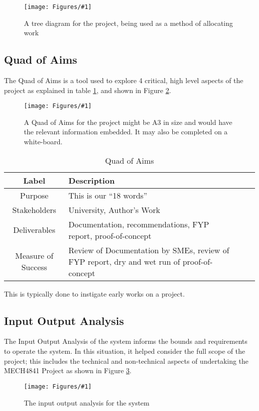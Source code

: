 \documentclass{UoNMCHA}
\newcommand{\fref}[1] {Figure \ref{#1}}
\newcommand{\fFigure}[3]{
	\begin{figure}[h]
        \begin{center}  
            \texttt{[image: Figures/\#1]}  
            \caption{#2}
            \label{#1}
        \end{center}
	\end{figure}
}
\numberwithin{equation}{section}
\begin{document}
 \fFigure{treeDiagram.png}{A tree diagram for the project, being used as a method of allocating work}{0.7}


\subsection{Quad of Aims}
The Quad of Aims is a tool used to explore 4 critical, high level aspects of the project as explained in table \ref{tab:QuadOfAims}, and shown in \fref{QuadOfAims2.png}.

\fFigure{QuadOfAims2.png}{A Quad of Aims for the project might be A3 in size and would have the relevant information embedded. It may also be completed on a white-board.}{1}

 \begin{table}[h]
    \begin{center}
        \caption{Quad of Aims }\label{tab:QuadOfAims}
        {\footnotesize
            \begin{tabular}{c l l l|}
                \hline\hline Label & Description \\ \hline 
                Purpose & This is our “18 words” \\
                Stakeholders & University, Author’s Work \\
                Deliverables & Documentation, recommendations, FYP report, proof-of-concept \\
                Measure of Success & Review of Documentation by SMEs, review of FYP report, dry and wet run of proof-of-concept \\
                \hline
            \end{tabular}
        }
    \end{center}
\end{table}

This is typically done to instigate early works on a project.

\subsection{Input Output Analysis}
The Input Output Analysis of the system informs the bounds and requirements to operate the system. In this situation, it helped consider the full scope of the project; this includes the technical and non-technical aspects of undertaking the MECH4841 Project as shown in \fref{InputOutput.png}.

\fFigure{InputOutput.png}{The input output analysis for the system}{0.75}
\end{document}
